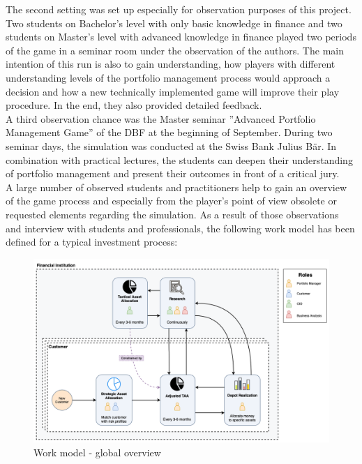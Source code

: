 The second setting was set up especially for observation purposes of this project. Two students on Bachelor’s level with only basic knowledge in finance and two students on Master’s level with advanced knowledge in finance played two periods of the game in a seminar room under the observation of the authors. The main intention of this run is also to gain understanding, how players with different understanding levels of the portfolio management process would approach a decision and how a new technically implemented game will improve their play procedure. In the end, they also provided detailed feedback. \\

A third observation chance was the Master seminar ''Advanced Portfolio Management Game'' of the DBF at the beginning of September. During two seminar days, the simulation was conducted at the Swiss Bank Julius Bär. In combination with practical lectures, the students can deepen their understanding of portfolio management and present their outcomes in front of a critical jury. \\

A large number of observed students and practitioners help to gain an overview of the game process and especially from the player’s point of view obsolete or requested elements regarding the simulation. As a result of those observations and interview with students and professionals, the following work model has been defined for a typical investment process: \\

\begin{figure}[h!]
  \centering
  \includegraphics[scale=0.35]{img/work_model_process.png}
  \caption{Work model - global overview}
\end{figure}


